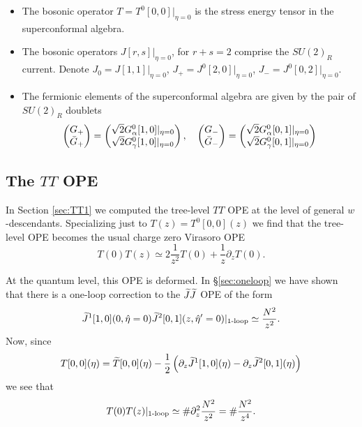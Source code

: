 \documentclass[../main.tex]{subfiles}
\begin{document}
\begin{itemize}
\item The bosonic operator $T = T^0 [0,0]|_{\eta = 0}$ is the stress energy tensor in the superconformal algebra. 
\item The bosonic operators $J [r,s]|_{\eta = 0}$, for $r + s = 2$ comprise the $SU(2)_R$ current.
Denote $J_0 = J [1,1]|_{\eta = 0}$, $J_+ = J^0 [2,0]|_{\eta = 0}$, $J_- = J^0[0,2]|_{\eta = 0}$. 
\item The fermionic elements of the superconformal algebra are given by the pair of $SU(2)_R$ doublets 
\[
\begin{pmatrix} G_+ \\ \Bar{G}_+ \end{pmatrix} = \begin{pmatrix} \sqrt{2} G^0_\alpha [1,0]|_{\eta = 0} \\ \sqrt{2} G^0_\gamma [1,0]|_{\eta = 0} \end{pmatrix} , \quad \begin{pmatrix} G_- \\ \Bar{G}_- \end{pmatrix} = \begin{pmatrix} \sqrt{2} G^0_\alpha [0,1]|_{\eta = 0} \\ \sqrt{2} G^0_\gamma [0,1]|_{\eta = 0} \end{pmatrix}
\]
\end{itemize}


\subsection{The $TT$ OPE}

In Section \ref{sec:TT1} we computed the tree-level $TT$ OPE at the level of general $w$-descendants.
Specializing just to $T (z) = T^0[0,0](z)$ we find that the tree-level OPE becomes the usual charge zero Virasoro OPE
\[
T(0) T(z) \simeq 2 \frac{1}{z^2} T(0) + \frac{1}{z} \partial_z T(0) .
\]

At the quantum level, this OPE is deformed. 
In \S \ref{sec:oneloop} we have shown that there is a one-loop correction to the $\widetilde J \widetilde J$ OPE of the form 
\[
\widetilde J^{1}[1,0] (0, \Hat\eta = 0) \widetilde J^{2} [0,1] (z, \Hat\eta'=0) |_{\text{1-loop}} \simeq \frac{N^2}{z^2} .
\]
Now, since 
\[
T[0,0] (\eta) = \widetilde T[0,0] (\eta) - \frac12 \left(\partial_z \widetilde J^{1}[1,0] (\eta) - \partial_z \widetilde J^{2}[0,1] (\eta) \right) 
\]
we see that 
\[
T(0) T(z)|_{\text{1-loop}} \simeq \# \partial_z^2 \frac{N^2}{z^2} = \# \frac{N^2}{z^4} .
\]
\end{document}
